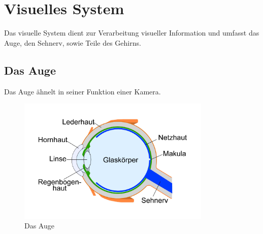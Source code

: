 \section{Visuelles System}
Das visuelle System dient zur Verarbeitung visueller Information und umfasst das Auge, den Sehnerv, sowie Teile des Gehirns.

\subsection{Das Auge}
Das Auge ähnelt in seiner Funktion einer Kamera.

\begin{figure}
	\centering
	\includegraphics[height=6cm]{images/auge.jpg}
	\caption{Das Auge \cite{auge}}
\end{figure}
